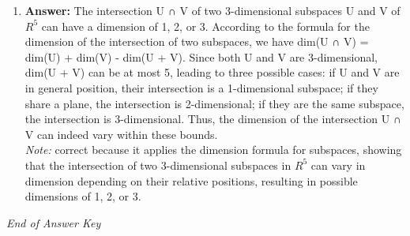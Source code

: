 \documentclass[12pt]{article}
\begin{document}
\begin{enumerate}[label=\arabic*.]
\\ \textit{Note:} The answer correctly identifies the relationships between the unit vector $\mathbf{v}$ and the given vectors by using the cosine of the angles to establish equations, which, along with the unit vector condition, allows for the determination of the distinct vectors $\mathbf{v}_1$ and $\mathbf{v}_2$.
\item \textbf{Answer:} The intersection U ∩ V of two 3-dimensional subspaces U and V of $R^5$ can have a dimension of 1, 2, or 3. According to the formula for the dimension of the intersection of two subspaces, we have dim(U ∩ V) = dim(U) + dim(V) - dim(U + V). Since both U and V are 3-dimensional, dim(U + V) can be at most 5, leading to three possible cases: if U and V are in general position, their intersection is a 1-dimensional subspace; if they share a plane, the intersection is 2-dimensional; if they are the same subspace, the intersection is 3-dimensional. Thus, the dimension of the intersection U ∩ V can indeed vary within these bounds.
\\ \textit{Note:} correct because it applies the dimension formula for subspaces, showing that the intersection of two 3-dimensional subspaces in $R^5$ can vary in dimension depending on their relative positions, resulting in possible dimensions of 1, 2, or 3.
\end{enumerate}

\vfill
\noindent\textit{End of Answer Key}
\end{document}
